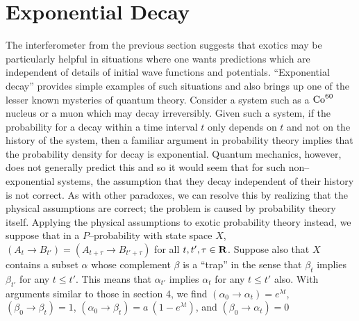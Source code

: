 \documentclass[12pt]{article}
\begin{document}
\section{Exponential Decay}

   The interferometer from the previous section suggests that exotics may be 
particularly helpful in situations where one wants predictions
which are independent of details of initial wave functions and potentials. 
``Exponential decay'' provides simple examples of such situations and also 
brings up one of the lesser known mysteries of quantum theory.  
Consider a system such as a ${\rm Co}^{60}$ nucleus or a muon which may 
decay irreversibly.  Given such a system, if the probability for a decay 
within a time interval $t$ only depends on $t$ and not on the history of 
the system, then a familiar argument in probability theory implies that 
the probability density for decay is exponential.  Quantum mechanics, however, does 
not generally predict this\cite{sakurai} and so it would
seem that for such
non--exponential systems, the assumption that they decay independent of their
history is not correct.
As with other paradoxes\cite{santafe}, we can resolve this by realizing that
the physical assumptions are correct; the problem is caused by probability 
theory itself.
Applying the physical assumptions to exotic probability theory instead, we suppose that in a $P$--probability with state space $X$,
$(A_t\rightarrow B_{t'})=(A_{t+\tau}\rightarrow B_{t'+\tau})$ for all $t,t',\tau\in {\bf R}$.
Suppose also that $X$ contains a subset $\alpha$ whose complement $\beta$ is a ``trap''
in the sense that $\beta_t$ implies $\beta_{t'}$ for any $t\leq t'$.  This 
means that $\alpha_{t'}$ implies $\alpha_{t}$ for any $t\leq t'$ also.  With arguments similar to 
those in section 4, we find 
$(\alpha_0\rightarrow \alpha_t) = e^{\lambda t}$,
$(\beta_0\rightarrow \beta_t) = 1$,
$(\alpha_0\rightarrow \beta_t) = a\ (1-e^{\lambda t})$,
and $(\beta_0\rightarrow \alpha_t) = 0$
\end{document}
